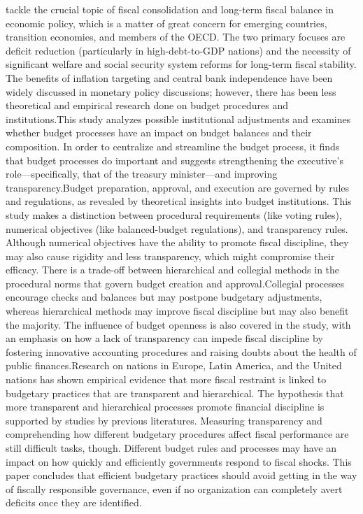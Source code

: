  tackle the crucial topic of fiscal consolidation and long-term fiscal balance in economic policy, which is a matter of great concern for emerging countries, transition economies, and members of the OECD. The two primary focuses are deficit reduction (particularly in high-debt-to-GDP nations) and the necessity of significant welfare and social security system reforms for long-term fiscal stability. The benefits of inflation targeting and central bank independence have been widely discussed in monetary policy discussions; however, there has been less theoretical and empirical research done on budget procedures and institutions.This study analyzes possible institutional adjustments and examines whether budget processes have an impact on budget balances and their composition. In order to centralize and streamline the budget process, it finds that budget processes do important and suggests strengthening the executive's role—specifically, that of the treasury minister—and improving transparency.Budget preparation, approval, and execution are governed by rules and regulations, as revealed by theoretical insights into budget institutions. This study makes a distinction between procedural requirements (like voting rules), numerical objectives (like balanced-budget regulations), and transparency rules. Although numerical objectives have the ability to promote fiscal discipline, they may also cause rigidity and less transparency, which might compromise their efficacy. There is a trade-off between hierarchical and collegial methods in the procedural norms that govern budget creation and approval.Collegial processes encourage checks and balances but may postpone budgetary adjustments, whereas hierarchical methods may improve fiscal discipline but may also benefit the majority. The influence of budget openness is also covered in the study, with an emphasis on how a lack of transparency can impede fiscal discipline by fostering innovative accounting procedures and raising doubts about the health of public finances.Research on nations in Europe, Latin America, and the United nations has shown empirical evidence that more fiscal restraint is linked to budgetary practices that are transparent and hierarchical. The hypothesis that more transparent and hierarchical processes promote financial discipline is supported by studies by previous literatures. Measuring transparency and comprehending how different budgetary procedures affect fiscal performance are still difficult tasks, though. Different budget rules and processes may have an impact on how quickly and efficiently governments respond to fiscal shocks. This paper concludes that efficient budgetary practices should avoid getting in the way of fiscally responsible governance, even if no organization can completely avert deficits once they are identified.\par
